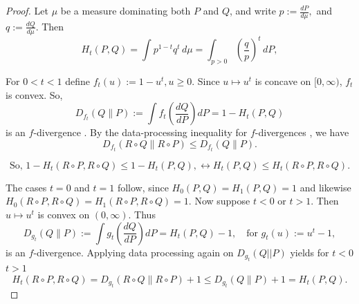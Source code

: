 \begin{proof}
Let \(\mu\) be a measure dominating both \(P\) and \(Q\), and write $p:=\frac{dP}{d\mu},$ and $
q:=\frac{dQ}{d\mu}.$
Then
\[
H_t(P,Q)
=
\int p^{1-t}q^t\,d\mu
=
\int_{p>0} \left(\frac{q}{p}\right)^t\,dP, 
\]


For \(0<t<1\) define  $f_t(u):=1-u^t,  u\ge0.$ Since \(u\mapsto u^t\) is concave on \([0,\infty)\), \(f_t\) is convex. So,
\[
D_{f_t}(Q\|P)
:=
\int f_t\!\left(\frac{dQ}{dP}\right)dP
=
1-H_t(P,Q)
\]
is an \(f\)-divergence \citet[Definition 7.1]{polyanskiy_wu_2025}. By the data-processing inequality for \(f\)-divergences \citet[Theorem 7.4]{polyanskiy_wu_2025}, we have 
\[
D_{f_t}(R\circ Q\|R\circ P)\le D_{f_t}(Q\|P).
\]

\[
\text{So, } 1-H_t(R\circ P,R\circ Q)\le 1-H_t(P,Q), \leftrightarrow 
H_t(P,Q)\le H_t(R\circ P,R\circ Q).
\]

The cases \(t=0\) and \(t=1\) follow, since $H_0(P,Q)=H_1(P,Q)=1$ and likewise $H_0(R\circ P,R\circ Q)=H_1(R\circ P,R\circ Q)=1.$ Now suppose \(t<0\) or \(t>1\). Then \(u\mapsto u^t\) is convex on
\((0,\infty)\). Thus
\[
D_{g_t}(Q\|P)
:=
\int g_t\!\left(\frac{dQ}{dP}\right)dP= H_t(P,Q) -1,
\quad \text{for }
g_t(u):=u^t -1,
\]
is an \(f\)-divergence.  Applying data processing again on $D_{g_{t}}(Q||P)$ yields for  $t<0$  $t>1$
\[
H_t(R\circ P,R \circ Q)
=
D_{g_t}(R\circ Q\|R\circ P) + 1
\le
D_{g_t}(Q\|P) +1
=
H_t(P,Q).
\]



\end{proof}

